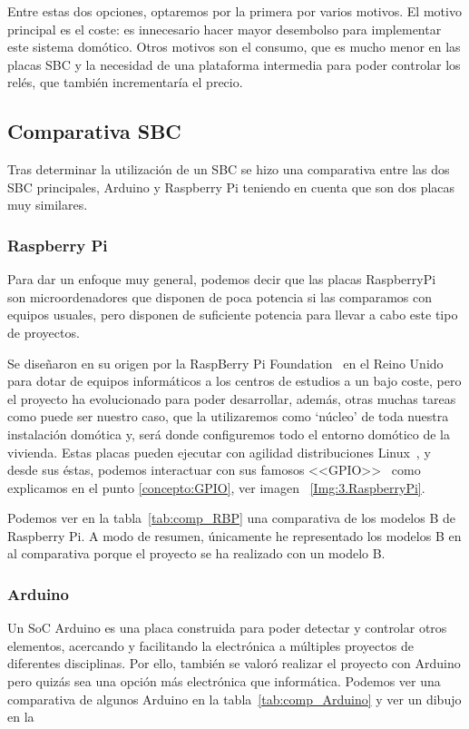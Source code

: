 Entre estas dos opciones, optaremos por la primera por varios motivos. El motivo principal es el coste: es innecesario hacer mayor desembolso para implementar este sistema domótico. Otros motivos son el consumo, que es mucho menor en las placas SBC y la necesidad de una plataforma intermedia para poder controlar los relés, que también incrementaría el precio.

\subsection{Comparativa SBC}
Tras determinar la utilización de un SBC se hizo una comparativa entre las dos SBC principales, Arduino y Raspberry Pi teniendo en cuenta que son dos placas muy similares.

\subsubsection{Raspberry Pi}\label{4:RaspberryPi}
Para dar un enfoque muy general, podemos decir que las placas RaspberryPi~\cite{misc:RbPWeb} son microordenadores que disponen de poca potencia si las comparamos con equipos usuales, pero disponen de suficiente potencia para llevar a cabo este tipo de proyectos.

Se diseñaron en su origen por la RaspBerry Pi Foundation~\cite{misc:RbPWeb} en el Reino Unido para dotar de equipos informáticos a los centros de estudios a un bajo coste, pero el proyecto ha evolucionado para poder desarrollar, además, otras muchas tareas como puede ser nuestro caso, que la utilizaremos como ‘núcleo’ de toda nuestra instalación domótica y, será donde configuremos todo el entorno domótico de la vivienda.
Estas placas pueden ejecutar con agilidad distribuciones Linux~\cite{misc:Linux}, y desde sus éstas, podemos interactuar con sus famosos <<GPIO>>~\cite{misc:descubrearduino} como explicamos en el punto \ref{concepto:GPIO}, ver imagen ~\ref{Img:3.RaspberryPi}.

Podemos ver en la tabla~\ref{tab:comp_RBP} una comparativa de los modelos B de Raspberry Pi. A modo de resumen, únicamente he representado los modelos B en al comparativa porque el proyecto se ha realizado con un modelo B.

\subsubsection{Arduino}\label{4:Arduino}

Un SoC Arduino es una placa construida para poder detectar y controlar otros elementos, acercando y facilitando la electrónica a múltiples proyectos de diferentes disciplinas. Por ello, también se valoró realizar el proyecto con Arduino pero quizás sea una opción más electrónica que informática.
Podemos ver una comparativa de algunos Arduino en la tabla~\ref{tab:comp_Arduino} y ver un dibujo en la

